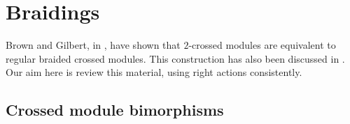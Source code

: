 

\newpage
\section{Braidings} \label{sec:braiding}

Brown and Gilbert, in \cite{brow:gilb}, have shown that 
$2$-crossed modules are equivalent to regular braided crossed modules. 
This construction has also been discussed in \cite{brow:icen}. 
Our aim here is review this material, using right actions consistently. 


\subsection{Crossed module bimorphisms}  \label{subsec:xmod-bim}

